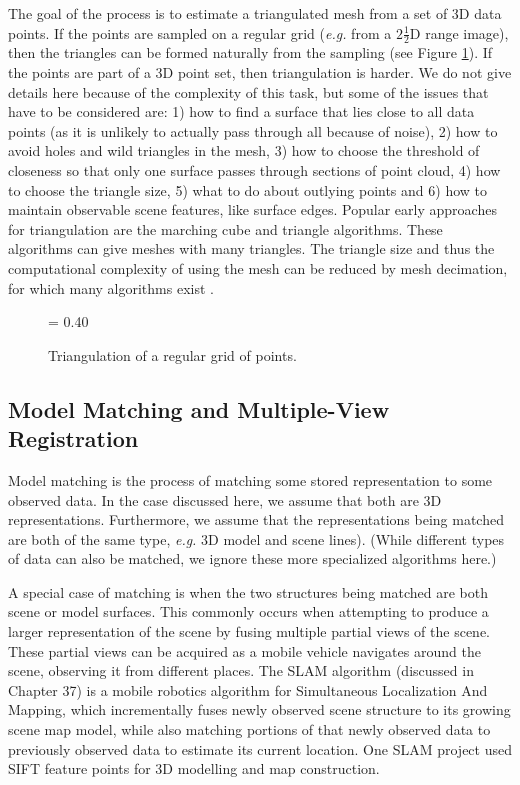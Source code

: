 \documentclass[twocolumn,oneside]{book}
\begin{document}
\begin{itemize}
The goal of the process is to estimate a triangulated mesh from a set of 
3D data points.
If the points are sampled on a regular grid ({\it e.g.} from a $2\frac{1}{2}$D
range image), then the triangles can be
formed naturally from the sampling (see Figure \ref{pltri}).
If the points are part of a 3D point set, then triangulation is harder.
We do not give details here because of the complexity of this task,
but some of the issues that have to be considered are:
1) how to find a surface that lies close to all data points 
(as it is unlikely to actually pass through all because of noise),
2) how to avoid holes and wild triangles in the mesh,
3) how to choose the threshold of closeness so that only one surface
passes through sections of point cloud,
4) how to choose the triangle size,
5) what to do about outlying points and
6) how to maintain observable scene features, like surface edges.
Popular early approaches for triangulation are the marching
cube and triangle \cite{hoppe,hilton2} algorithms.
These algorithms can give meshes with many triangles.
The triangle size and thus the computational complexity of using the
mesh can be reduced by mesh decimation, for which many algorithms
exist \cite{hoppe2,Schroeder}.
\begin{figure}[htb]
{\epsfxsize = 0.40\textwidth {}}
\caption{Triangulation of a regular grid of points.
\label{pltri}}
\end{figure}

\end{itemize}


\subsection{Model Matching and Multiple-View Registration\label{match22}} 

Model matching is the process of matching some stored representation
to some observed data. In the case discussed here, we assume that
both are 3D representations.
Furthermore, we assume that the representations being matched are both of
the same type, {\it e.g.} 3D model and scene lines).
(While different types of data can also be matched, we ignore these
more specialized algorithms here.)

A special case of matching is when the two structures being matched are
both scene or model surfaces.
This commonly occurs when attempting to produce a larger 
representation of the scene by fusing multiple partial views of the scene.
These partial views can be acquired as a mobile vehicle navigates
around the scene, observing it from different places.
The SLAM algorithm \cite{thrun} (discussed in Chapter 37) is a 
mobile robotics algorithm for Simultaneous Localization And Mapping,
which incrementally fuses newly observed scene structure to its
growing scene map model, while also matching portions of that newly observed
data to previously observed data to estimate its current location.
One SLAM project \cite{little} used SIFT feature points for 3D modelling and map construction.
\end{document}
